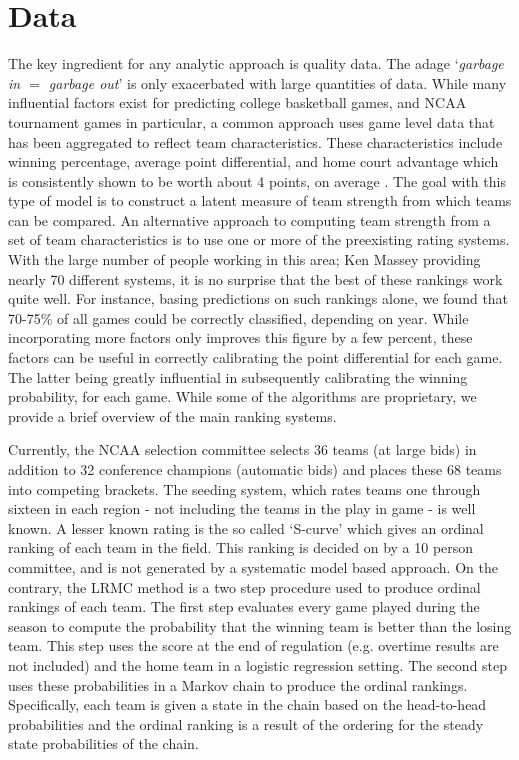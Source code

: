 \documentclass[letterpaper,12pt]{article}
\begin{document}
\section{Data}
The key ingredient for any analytic approach is quality data. The adage `\emph{garbage in $=$ garbage out}' is only exacerbated with large quantities of data. While many influential factors exist for predicting college basketball games, and NCAA tournament games in particular, a common approach uses game level data that has been aggregated to reflect team characteristics. These characteristics include winning percentage, average point differential, and home court advantage which is consistently shown to be worth about 4 points, on average \citep{harville1994}. The goal with this type of model is to construct a latent measure of team strength from which teams can be compared. An alternative approach to computing team strength from a set of team characteristics is to use one or more of the preexisting rating systems. With the large number of people working in this area; Ken Massey \citep{kenmassey.com} providing nearly 70 different systems, it is no surprise that the best of these rankings work quite well. For instance, basing predictions on such rankings alone, we found that 70-75\% of all games could be correctly classified, depending on year. While incorporating more factors only improves this figure by a few percent, these factors can be useful in correctly calibrating the point differential for each game. The latter being greatly influential in subsequently calibrating the winning probability, for each game.
While some of the algorithms are proprietary, we provide a brief overview of the main ranking systems.

Currently, the NCAA selection committee selects 36 teams (at large bids) in addition to 32 conference champions (automatic bids) and places these 68 teams into competing brackets. The seeding system, which rates teams one through sixteen in each region - not including the teams in the play in game - is well known. A lesser known rating is the so called `S-curve' which gives an ordinal ranking of each team in the field. This ranking is decided on by a 10 person committee, and is not generated by a systematic model based approach. On the contrary, 
the LRMC method \citep{Kvam2006, mark2010} is a two step procedure used to produce ordinal rankings of each team. The first step evaluates every game played during the season to compute the probability that the winning team is better than the losing team. This step uses the score at the end of regulation (e.g. overtime results are not included) and the home team in a logistic regression setting. The second step uses these probabilities in a Markov chain to produce the ordinal rankings. Specifically, each team is given a state in the chain based on the head-to-head probabilities and the ordinal ranking is a result of the ordering for the steady state probabilities of the chain.
\end{document}

